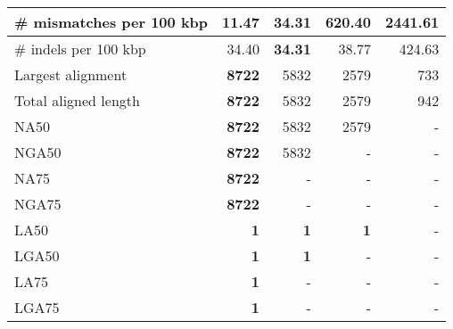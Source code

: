 \documentclass[12pt,a4paper]{article}
\begin{document}
\begin{table}[ht]
\begin{center}
\begin{tabular}{|l*{4}{|r}|}
\# mismatches per 100 kbp & {\bf 11.47} & 34.31 & 620.40 & 2441.61 \\ \hline
\# indels per 100 kbp & 34.40 & {\bf 34.31} & 38.77 & 424.63 \\ \hline
Largest alignment & {\bf 8722} & 5832 & 2579 & 733 \\ \hline
Total aligned length & {\bf 8722} & 5832 & 2579 & 942 \\ \hline
NA50 & {\bf 8722} & 5832 & 2579 & - \\ \hline
NGA50 & {\bf 8722} & 5832 & - & - \\ \hline
NA75 & {\bf 8722} & - & - & - \\ \hline
NGA75 & {\bf 8722} & - & - & - \\ \hline
LA50 & {\bf 1} & {\bf 1} & {\bf 1} & - \\ \hline
LGA50 & {\bf 1} & {\bf 1} & - & - \\ \hline
LA75 & {\bf 1} & - & - & - \\ \hline
LGA75 & {\bf 1} & - & - & - \\ \hline
\end{tabular}
\end{center}
\end{table}
\end{document}
